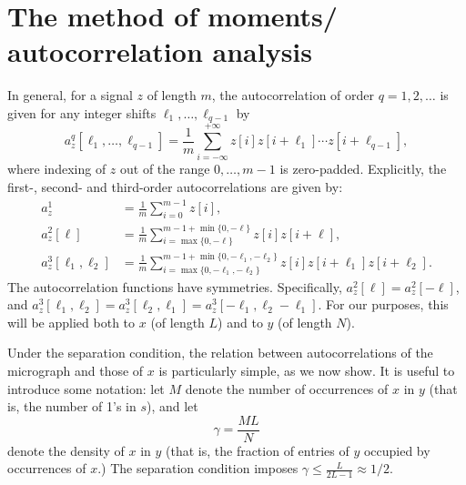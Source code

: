 \documentclass[12pt]{article}
\newcommand{\1}{\mathbf{1}}
\newcommand{\TODO}[1]{{\color{red}{[#1]}}}
\theoremstyle{plain}
\theoremstyle{definition}
\theoremstyle{remark}
\theoremstyle{plain}
\theoremstyle{remark}
\theoremstyle{plain}
\theoremstyle{plain}
\begin{document}
\section{The method of moments/ autocorrelation analysis} \label{sec:AC_analysis}
\TODO{copied from PNAS's paper}
In general, for a signal $z$ of length $m$, the autocorrelation of order $q = 1, 2, \ldots$ is given for any integer shifts $\ell_1, \ldots, \ell_{q-1}$ by
\begin{equation}
a_z^q[\ell_1,\ldots,\ell_{q-1}]   = \frac{1}{m} \sum_{i=-\infty}^{+\infty} z[i]z[i+\ell_1]\cdots z[i+\ell_{q-1}],
\label{eq:ac_general}
\end{equation}
where indexing of $z$ out of the range $0, \ldots, m-1$ is zero-padded.
Explicitly, the first-, second- and third-order autocorrelations are given by: 
\begin{align} 
a_z^1 & = \frac{1}{m} \sum_{i=0}^{m-1} z[i], \nonumber\\
a_z^2[\ell] & = \frac{1}{m} \sum_{i = \max\{0, -\ell\}}^{m-1 + \min\{0, -\ell\}} z[i]z[i+\ell],\\
a_z^3[\ell_1,\ell_2] & = \frac{1}{m} \sum_{i = \max\{0, -\ell_1, -\ell_2\}}^{m-1 + \min\{0, -\ell_1, -\ell_2\}} z[i]z[i+\ell_1]z[i+\ell_2].  \nonumber \label{eq:ac_special}
\end{align}
The autocorrelation functions have symmetries. Specifically, $a_z^2[\ell] = a_z^2[-\ell]$, and
$a_z^3[\ell_1,\ell_2] = a_z^3[\ell_2,\ell_1]=a_z^3[-\ell_1,\ell_2-\ell_1].
$
For our purposes, this will be applied both to $x$ (of length $L$) and to $y$ (of length $N$).

Under the separation condition, the relation between autocorrelations of the micrograph and those of $x$ is particularly simple, as we now show. It is useful to introduce some notation: let $M$ denote the number of occurrences of $x$ in $y$ (that is, the number of 1's in $s$), and let
\begin{equation}
\gamma  = \frac{M L}{N}
\label{eq:gamma}
\end{equation}
denote the density of $x$ in $y$ (that is, the fraction of entries of $y$ occupied by occurrences of $x$.) The separation condition %
imposes $\gamma\leq\frac{L}{2L-1}\approx 1/2$.
\end{document}
